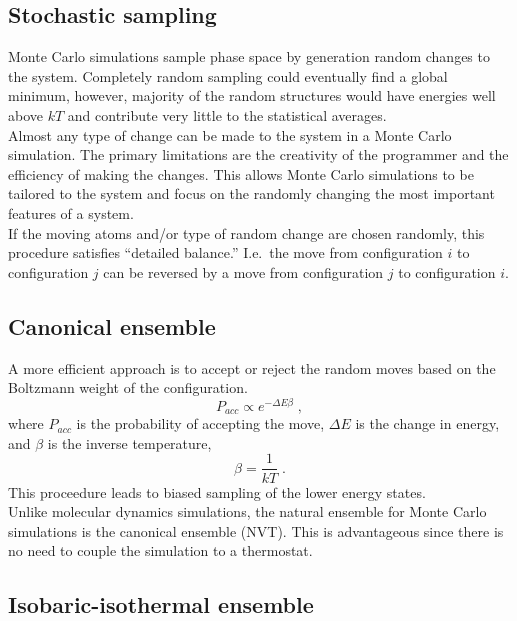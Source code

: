 \documentclass[12pt]{report}
\begin{document}
\subsection{Stochastic sampling}

Monte Carlo simulations sample phase space by generation random changes to
the system.
Completely random sampling could eventually find a global minimum, however,
majority of the random structures would have energies well above $kT$ and
contribute very little to the statistical averages. \\

Almost any type of change can be made to the system in a Monte Carlo
simulation.
The primary limitations are the creativity of the programmer and the
efficiency of making the changes.
This allows Monte Carlo simulations to be tailored to the system and focus on
the randomly changing the most important features of a system. \\

If the moving atoms and/or type of random change are chosen randomly, this
procedure satisfies ``detailed balance.''
I.e.\ the move from configuration $i$ to configuration $j$ can be reversed by
a move from configuration $j$ to configuration $i$.

\subsection{Canonical ensemble}

A more efficient approach is to accept or reject the random moves based on
the Boltzmann weight of the configuration.
\begin{equation}
 P_{acc} \propto e^{-\Delta E\beta} \; ,
\end{equation}
where $P_{acc}$ is the probability of accepting the move, $\Delta E$ is the
change in energy, and $\beta$ is the inverse temperature,
\begin{equation}
 \beta = \frac{1}{kT} \; .
\end{equation}
This proceedure leads to biased sampling of the lower energy states. \\

Unlike molecular dynamics simulations, the natural ensemble for Monte Carlo
simulations is the canonical ensemble (NVT).
This is advantageous since there is no need to couple the simulation to a
thermostat.

\subsection{Isobaric-isothermal ensemble}
\end{document}
